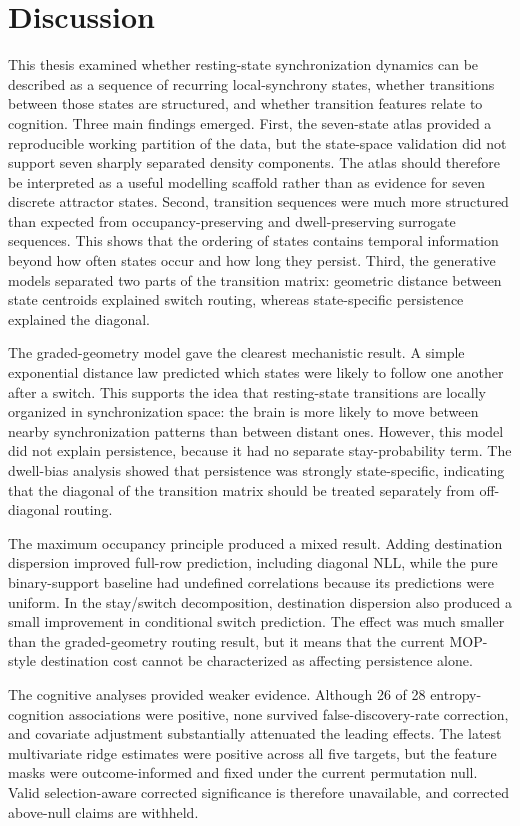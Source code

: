 \documentclass[12pt,a4paper]{report}
\begin{document}
\chapter{Discussion}
This thesis examined whether resting-state synchronization dynamics can be described as a
sequence of recurring local-synchrony states, whether transitions between those states are
structured, and whether transition features relate to cognition. Three main findings emerged.
First, the seven-state atlas provided a reproducible working partition of the data, but the
state-space validation did not support seven sharply separated density components. The atlas
should therefore be interpreted as a useful modelling scaffold rather than as evidence for seven
discrete attractor states. Second, transition sequences were much more structured than expected
from occupancy-preserving and dwell-preserving surrogate sequences. This shows that the
ordering of states contains temporal information beyond how often states occur and how long
they persist. Third, the generative models separated two parts of the transition matrix: geometric
distance between state centroids explained switch routing, whereas state-specific persistence
explained the diagonal.

The graded-geometry model gave the clearest mechanistic result. A simple exponential
distance law predicted which states were likely to follow one another after a switch. This supports
the idea that resting-state transitions are locally organized in synchronization space: the brain is
more likely to move between nearby synchronization patterns than between distant ones. However,
this model did not explain persistence, because it had no separate stay-probability term. The
dwell-bias analysis showed that persistence was strongly state-specific, indicating that the
diagonal of the transition matrix should be treated separately from off-diagonal routing.

The maximum occupancy principle produced a mixed result. Adding destination dispersion
improved full-row prediction, including diagonal NLL, while the pure binary-support baseline
had undefined correlations because its predictions were uniform. In the stay/switch
decomposition, destination dispersion also produced a small improvement in conditional switch
prediction. The effect was much smaller than the graded-geometry routing result, but it means
that the current MOP-style destination cost cannot be characterized as affecting persistence
alone.

The cognitive analyses provided weaker evidence. Although 26 of 28 entropy-cognition
associations were positive, none survived false-discovery-rate correction, and covariate
adjustment substantially attenuated the leading effects. The latest multivariate ridge estimates
were positive across all five targets, but the feature masks were outcome-informed and fixed
under the current permutation null. Valid selection-aware corrected significance is therefore
unavailable, and corrected above-null claims are withheld.
\end{document}
